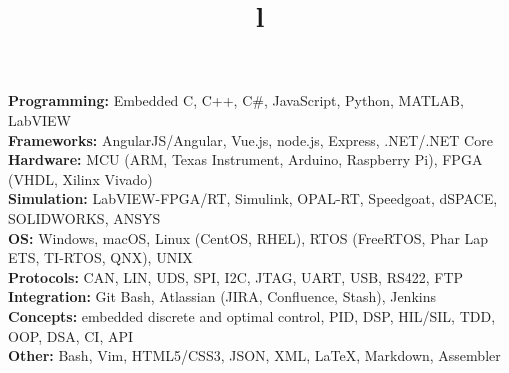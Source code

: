 \documentclass[mm]{res}
\begin{document}



\begin{resume}

\npspctoprule
\section{\headingskills}
\tb \textbf{Programming:} Embedded C, C++, C\#, JavaScript, Python, MATLAB, LabVIEW \\
\tb \textbf{Frameworks:} AngularJS/Angular, Vue.js, node.js, Express, .NET/.NET Core\\
\tb \textbf{Hardware:} MCU (ARM, Texas Instrument, Arduino, Raspberry Pi), FPGA (VHDL, Xilinx Vivado)\\
\tb \textbf{Simulation:} LabVIEW-FPGA/RT, Simulink, OPAL-RT, Speedgoat, dSPACE, SOLIDWORKS, ANSYS\\
\tb \textbf{OS:} Windows, macOS, Linux (CentOS, RHEL), RTOS (FreeRTOS, Phar Lap ETS, TI-RTOS, QNX), UNIX\\
\tb \textbf{Protocols:} CAN, LIN, UDS, SPI, I2C, JTAG, UART, USB, RS422, FTP\\
\tb \textbf{Integration:} Git Bash, Atlassian (JIRA, Confluence, Stash), Jenkins\\
 \tb \textbf{Concepts:} embedded discrete and optimal control, PID, DSP, HIL/SIL, TDD, OOP, DSA, CI, API\\
\tb \textbf{Other:} Bash, Vim, HTML5/CSS3, JSON, XML, \LaTeX, Markdown, Assembler


\toprule

\section{\headingeducation}
\begin{format}
\\
\title{l}\\
\end{format}


\end{resume}
\end{document}
